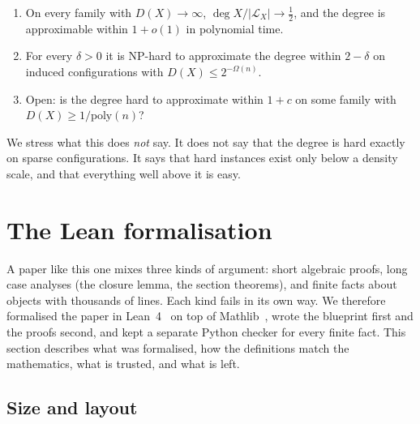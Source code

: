 \documentclass[a4paper,onecolumn,11pt,unpublished,nopdfoutputerror]{quantumarticle}
\theoremstyle{definition}
\renewcommand{\deg}{\operatorname{deg}}
\newcommand{\Lines}{\mathcal{L}}
\begin{document}
\begin{summarybox}
\begin{enumerate}[label=(\alph*),leftmargin=*]
\item On every family with $D(X)\to\infty$, $\deg X/|\Lines_X|\to\tfrac12$, and the degree is approximable within
$1+o(1)$ in polynomial time.
\item For every $\delta>0$ it is NP-hard to approximate the degree within $2-\delta$ on induced configurations with
$D(X)\le2^{-\Omega(n)}$.
\item Open: is the degree hard to approximate within $1+c$ on some family with $D(X)\ge1/\mathrm{poly}(n)$?
\end{enumerate}
\end{summarybox}

We stress what this does \emph{not} say. It does not say that the degree is hard exactly on sparse
configurations. It says that hard instances exist only below a density scale, and that everything well above it is
easy.

\section{The Lean formalisation}\label{sec:lean}

A paper like this one mixes three kinds of argument: short algebraic proofs, long case analyses (the closure lemma,
the section theorems), and finite facts about objects with thousands of lines. Each kind fails in its own way. We
therefore formalised the paper in Lean~4~\cite{Lean4} on top of Mathlib~\cite{Mathlib}, wrote the blueprint first
and the proofs second, and kept a separate Python checker for every finite fact. This section describes what was
formalised, how the definitions match the mathematics, what is trusted, and what is left.

\subsection{Size and layout}
\end{document}

